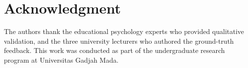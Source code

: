 \documentclass[conference,a4paper]{IEEEtran}
\begin{document}
\section*{Acknowledgment}

The authors thank the educational psychology experts who provided qualitative validation, and the three university lecturers who authored the ground-truth feedback. This work was conducted as part of the undergraduate research program at Universitas Gadjah Mada.

{}


\end{document}
